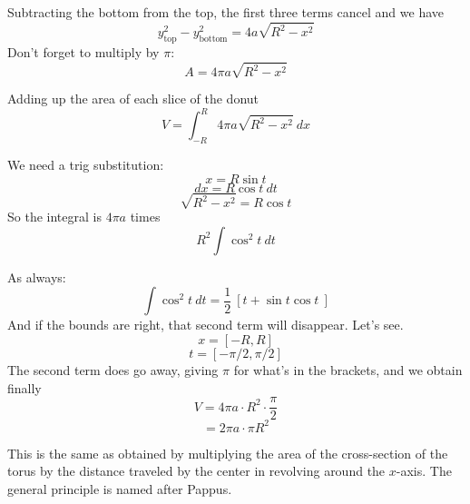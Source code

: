 \documentclass[11pt, oneside]{article}
\begin{document}
Subtracting the bottom from the top, the first three terms cancel and we have
\[ y_{\text{top}}^2 - y_{\text{bottom}}^2 = 4 a \sqrt{R^2 - x^2} \]
Don't forget to multiply by $\pi$:
\[ A = 4 \pi a \sqrt{R^2 - x^2} \]

Adding up the area of each slice of the donut
\[ V = \int_{-R}^{R} 4 \pi a \sqrt{R^2 - x^2} \ dx \]

We need a trig substitution:
\[ x = R \sin t \]
\[ dx = R \cos t \ dt \]
\[ \sqrt{R^2 - x^2} = R \cos t \]
So the integral is $4 \pi a$ times
\[ R^2 \int \cos^2 t \ dt \]

As always:
\[ \int \cos^2 t \ dt = \frac{1}{2} \ [ t + \sin t \cos t \ ]  \]
And if the bounds are right, that second term will disappear.  Let's see.
\[ x = [-R,R] \]
\[ t = [-\pi/2,\pi/2] \]
The second term does go away, giving $\pi$ for what's in the brackets, and we obtain finally
\[ V = 4 \pi a \cdot R^2 \cdot \frac{\pi}{2} \]
\[ = 2 \pi a \cdot \pi R^2 \]

This is the same as obtained by multiplying the area of the cross-section of the torus by the distance traveled by the center in revolving around the $x$-axis.  The general principle is named after Pappus.
\end{document}
